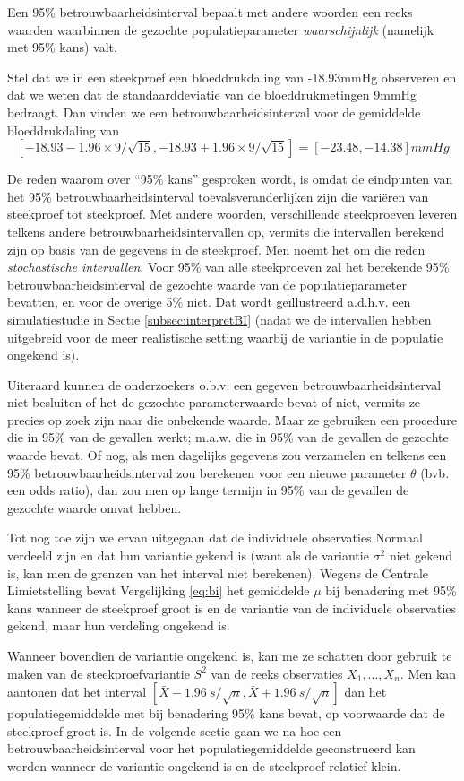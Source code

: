 \documentclass[
  12pt,dutch]{book}
\theoremstyle{definition}
\theoremstyle{definition}
\theoremstyle{definition}
\theoremstyle{definition}
\theoremstyle{remark}
\begin{document}
Een 95\% betrouwbaarheidsinterval bepaalt met andere woorden een reeks
waarden waarbinnen de gezochte populatieparameter \emph{waarschijnlijk}
(namelijk met 95\% kans) valt.

Stel dat we in een steekproef een bloeddrukdaling van -18.93mmHg observeren en dat we weten dat de standaarddeviatie van de bloeddrukmetingen 9mmHg bedraagt. Dan vinden we een betrouwbaarheidsinterval voor de gemiddelde bloeddrukdaling van
\[\left[-18.93-1.96\times 9/\sqrt{15},-18.93+1.96\times 9/\sqrt{15}\right]=[-23.48,-14.38]mmHg\]

De reden waarom over ``95\% kans'' gesproken wordt, is omdat de eindpunten van
het 95\% betrouwbaarheidsinterval toevalsveranderlijken zijn die variëren
van steekproef tot steekproef. Met andere woorden, verschillende
steekproeven leveren telkens andere betrouwbaarheidsintervallen op, vermits
die intervallen berekend zijn op basis van de gegevens in de steekproef. Men
noemt het om die reden \emph{stochastische intervallen}.
Voor 95\% van alle steekproeven zal het berekende 95\% betrouwbaarheidsinterval de
gezochte waarde van de populatieparameter bevatten, en voor de overige 5\%
niet. Dat wordt geïllustreerd a.d.h.v. een simulatiestudie in Sectie \ref{subsec:interpretBI} (nadat we de intervallen hebben uitgebreid voor de meer realistische setting waarbij de variantie in de populatie ongekend is).

Uiteraard kunnen de onderzoekers o.b.v. een gegeven betrouwbaarheidsinterval
niet besluiten of het de gezochte parameterwaarde bevat of niet, vermits ze
precies op zoek zijn naar die onbekende waarde. Maar ze gebruiken een
procedure die in 95\% van de gevallen werkt; m.a.w. die in 95\% van de
gevallen de gezochte waarde bevat. Of nog, als men dagelijks gegevens zou
verzamelen en telkens een 95\% betrouwbaarheidsinterval zou berekenen voor
een nieuwe parameter \(\theta\) (bvb. een odds ratio), dan zou men op lange termijn in 95\% van de gevallen de gezochte waarde omvat hebben.

Tot nog toe zijn we ervan uitgegaan dat de individuele observaties Normaal verdeeld zijn en dat hun variantie gekend is (want als de variantie \(\sigma^2\) niet gekend is, kan men de grenzen van het interval niet berekenen).
Wegens de Centrale Limietstelling bevat Vergelijking \eqref{eq:bi} het gemiddelde \(\mu\)
bij benadering met 95\% kans wanneer de steekproef groot is en de variantie
van de individuele observaties gekend, maar hun verdeling ongekend is.

Wanneer bovendien de variantie ongekend is, kan me ze schatten door gebruik te maken van de
steekproefvariantie \(S^2\) van de reeks observaties \(X_1,...,X_n\). Men kan aantonen dat
het interval \([\bar{X} - 1.96 \ s/\sqrt{n} , \bar{X} + 1.96 \ s/\sqrt{n} ]\)
dan het populatiegemiddelde met bij benadering 95\% kans bevat, op voorwaarde
dat de steekproef groot is. In de volgende sectie gaan we na hoe een
betrouwbaarheidsinterval voor het populatiegemiddelde geconstrueerd kan
worden wanneer de variantie ongekend is en de steekproef relatief klein.
\end{document}
